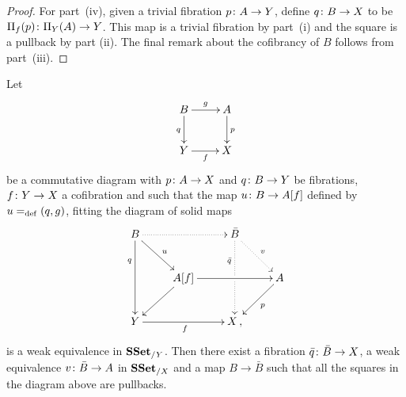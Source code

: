 \documentclass[reqno,10pt,a4paper,oneside,draft]{amsart}
\begin{document}
\begin{proof}
For part~(iv), given a trivial fibration $p \colon A \to Y$, define $q \colon B \to X$ to  be $\Pi_f(p) \colon \Pi_Y(A) \to Y$. This map is a trivial fibration by part~(i) and the square is a pullback by part (ii). The final remark about the cofibrancy of $B$ follows from part~(iii). \qedhere
\end{proof}





\begin{proposition}
\label{Prop:Homotopy_ext_prop}
Let 
\[
\xymatrix{
B \ar[r]^g \ar[d]_q & A \ar[d]^p \\
Y \ar[r]_f & X}
\]
be a commutative diagram with $p \colon A \to X$ and $q \colon B \to Y$ be fibrations, $f \colon Y \to X$ 
a cofibration and such that the map $u \colon B \to A[f]$ defined by $u =_{\operatorname{def}} (q, g)$, fitting the diagram 
of solid maps
\[ 
\xymatrix{
 B
  \ar@{.>}[rr]
  \ar[dr]^{u}
  \ar[dd]_(.3){q}
&&
  \bar{B}
  \ar@{.>}[dr]^{v}
  \ar@{.>}[dd]_(.3){\bar{q}}|{\hole}
&\\&
  A[f] 
  \ar[rr]
  \ar[dl]
&&
  A
  \ar[dl]^{p}
\\
  Y
  \ar[rr]_{f}
&&
  X \, ,
&
}
\]
is a weak equivalence in $\mathbf{SSet}_{/ Y}$. Then there exist a fibration $\bar{q} \colon \bar{B} \to X$, a weak equivalence $v \colon \bar{B} \to A$ in $\mathbf{SSet}_{/X}$ and a map $B \to \bar{B}$ such that all the squares in the diagram above are pullbacks. 
\end{proposition}
\end{document}
